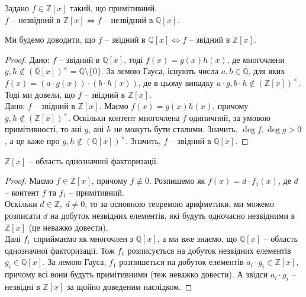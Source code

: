 \documentclass{math_library}
\begin{document}
\begin{corollary}
Задано $f \in \mathbb{Z}[x]$ такий, що примітивний.\\
$f$ -- незвідний в $\mathbb{Z}[x] \iff f$ -- незвідний в $\mathbb{Q}[x]$.
\end{corollary}

Ми будемо доводити, що $f$ -- звідний в $\mathbb{Q}[x] \iff f$ -- звідний в $\mathbb{Z}[x]$.

\begin{proof}
\rightproof Дано: $f$ -- звідний в $\mathbb{Q}[x]$, тоді $f(x) = g(x)h(x)$, де многочлени $g,h \notin (\mathbb{Q}[x])^\times = \mathbb{Q} \setminus \{0\}$. За лемою Гауса, існують числа $a,b \in \mathbb{Q}$, для яких $f(x) = (a \cdot g(x)) \cdot (b \cdot h(x))$, де в цьому випадку $a \cdot g, b \cdot h \notin (\mathbb{Z}[x])^\times$. Тоді ми довели, що $f$ -- звідний в $\mathbb{Z}[x]$.
\bigskip \\
\leftproof Дано: $f$ -- звідний в $\mathbb{Z}[x]$. Маємо $f(x) = g(x)h(x)$, причому $g,h \notin (\mathbb{Z}[x])^\times$. Оскільки контент многочлена $f$ одиничний, за умовою примітивності, то ані $g$, ані $h$ не можуть бути сталими. Значить, $\deg f, \deg g > 0$, а це каже про $g,h \notin (\mathbb{Q}[x])^\times$. Значить, $f$ -- звідний в $\mathbb{Q}[x]$.
\end{proof}

\begin{corollary}
$\mathbb{Z}[x]$ -- область однозначної факторизації.
\end{corollary}

\begin{proof}
Маємо $f \in \mathbb{Z}[x]$, причому $f \not\equiv 0$. Розпишемо як $f(x) = d \cdot f_1(x)$, де $d$ -- контент $f$ та $f_1$ -- примітивний.\\
Оскільки $d \in \mathbb{Z},\ d \neq 0$, то за основною теоремою арифметики, ми можемо розписати $d$ на добуток незвідних елементів, які будуть одночасно незвідними в $\mathbb{Z}[x]$ (це неважко довести).\\
Далі $f_1$ сприймаємо як многочлен з $\mathbb{Q}[x]$, а ми вже знаємо, що $\mathbb{Q}[x]$ -- область однозначної факторизації. Тож $f_1$ розписується на добуток незвідних елементів $g_i \in \mathbb{Q}[x]$. За лемою Гауса, $f_1$ розпишеться на добуток елементів $a_i \cdot g_i \in \mathbb{Z}[x]$, причому всі вони будуть примітивними (теж неважко довести). А звідси $a_i \cdot g_i$ -- незвідні в $\mathbb{Z}[x]$ за щойно доведеним наслідком.
\end{proof}
\end{document}
